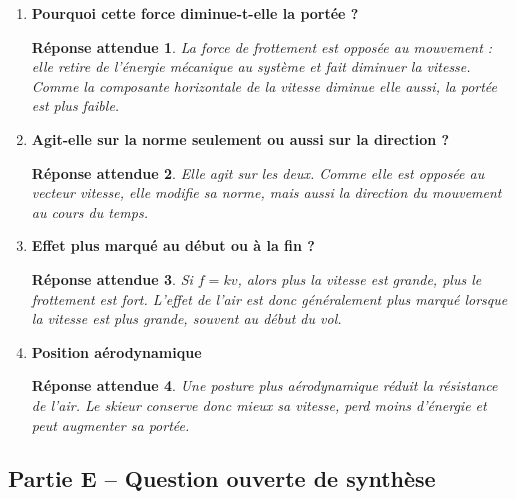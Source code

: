\documentclass[11pt,a4paper]{article}
\newtheorem*{reponseattendue}{Réponse attendue}
\begin{document}
\begin{enumerate}[label=\textbf{3.\arabic*}, resume, leftmargin=1.6em]

\item \textbf{Pourquoi cette force diminue-t-elle la portée ?}

\begin{reponseattendue}
La force de frottement est opposée au mouvement : elle retire de l’énergie mécanique au système et fait diminuer la vitesse.  
Comme la composante horizontale de la vitesse diminue elle aussi, la portée est plus faible.
\end{reponseattendue}

\item \textbf{Agit-elle sur la norme seulement ou aussi sur la direction ?}

\begin{reponseattendue}
Elle agit sur les deux.  
Comme elle est opposée au vecteur vitesse, elle modifie sa norme, mais aussi la direction du mouvement au cours du temps.
\end{reponseattendue}

\item \textbf{Effet plus marqué au début ou à la fin ?}

\begin{reponseattendue}
Si \(f=kv\), alors plus la vitesse est grande, plus le frottement est fort.  
L’effet de l’air est donc généralement plus marqué lorsque la vitesse est plus grande, souvent au début du vol.
\end{reponseattendue}

\item \textbf{Position aérodynamique}

\begin{reponseattendue}
Une posture plus aérodynamique réduit la résistance de l’air.  
Le skieur conserve donc mieux sa vitesse, perd moins d’énergie et peut augmenter sa portée.
\end{reponseattendue}

\end{enumerate}

\subsection*{Partie E -- Question ouverte de synthèse}
\end{document}

